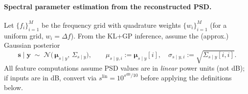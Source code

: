 \documentclass[11pt,a4paper]{report}
\theoremstyle{definition}
\providecommand{\ve}[1]{{\boldsymbol{#1}}}
\begin{document}
\paragraph*{Spectral parameter estimation from the reconstructed PSD.} Let $\{f_i\}_{i=1}^M$ be the frequency grid with quadrature weights $\{w_i\}_{i=1}^M$ (for a uniform grid, $w_i=\Delta f$). From the KL+GP inference, assume the (approx.) Gaussian posterior
\[
\ve{s}\mid \ve{y}\;\sim\;\mathcal{N}\!\big(\,\boldsymbol{\mu}_{s\mid y},\,\boldsymbol{\varSigma}_{s\mid y}\big),
\qquad
\mu_{s\mid y,i}:=\boldsymbol{\mu}_{s\mid y}[i],\quad
\sigma_{s\mid y,i}:=\sqrt{\boldsymbol{\varSigma}_{s\mid y}[i,i]}.
\]
All feature computations assume PSD values are in \emph{linear} power units (not dB); if inputs are in dB, convert via $s^{\mathrm{lin}}=10^{s^{\mathrm{dB}}/10}$ before applying the definitions below.
\end{document}
